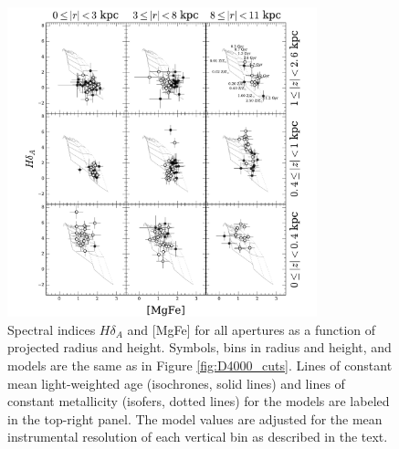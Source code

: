 \begin{figure}[t]
  \centering
  \includegraphics[width=0.8\textwidth]{891_1/figs/MgFe_multires.pdf}
  \caption{\label{fig:MgFe_cuts} Spectral indices $H\delta_A$ and
    [MgFe] for all apertures as a function of projected radius and
    height. Symbols, bins in radius and height, and models are the
    same as in Figure \ref{fig:D4000_cuts}. Lines of constant mean
    light-weighted age (isochrones, solid lines) and lines of constant
    metallicity (isofers, dotted lines) for the models are labeled in the
    top-right panel. The model values are adjusted for the mean
    instrumental resolution of each vertical bin as described in the
    text.}
\end{figure}

